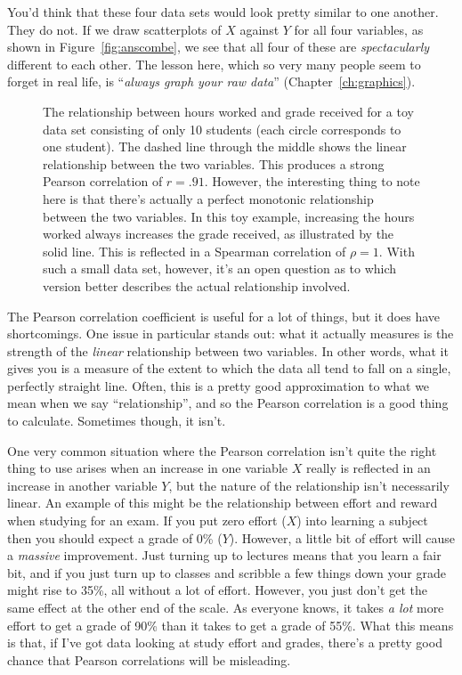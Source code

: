 You'd think that these four data sets would look pretty similar to one another. They do not. If we draw scatterplots of $X$ against $Y$ for all four variables, as shown in Figure~\ref{fig:anscombe}, we see that all four of these are {\it spectacularly} different to each other. The lesson here, which so very many people seem to forget in real life, is ``{\it always graph your raw data}'' (Chapter~\ref{ch:graphics}).


\begin{figure}[htb]
\begin{center}
\end{center}
\caption{The relationship between hours worked and grade received for a toy data set consisting of only 10 students (each circle corresponds to one student). The dashed line through the middle shows the linear relationship between the two variables. This produces a strong Pearson correlation of $r = .91$. However, the interesting thing to note here is that there's actually a perfect monotonic relationship between the two variables. In this toy example, increasing the hours worked always increases the grade received, as illustrated by the solid line. This is reflected in a Spearman correlation of $\rho = 1$. With such a small data set, however, it's an open question as to which version better describes the actual relationship involved. }
\HR
\label{fig:rankcorrpic}
\end{figure}

The Pearson correlation coefficient is useful for a lot of things, but it does have shortcomings. One issue in particular stands out: what it actually measures is the strength of the {\it linear} relationship between two variables. In other words, what it gives you is a measure of the extent to which the data all tend to fall on a single, perfectly straight line. Often, this is a pretty good approximation to what we mean when we say ``relationship'', and so the Pearson correlation is a good thing to calculate. Sometimes though, it isn't. 

One very common situation where the Pearson correlation isn't quite the right thing to use arises when an increase in one variable $X$ really is reflected in an increase in another variable $Y$, but the nature of the relationship isn't necessarily linear. An example of this might be the relationship between effort and reward when studying for an exam. If you put zero effort ($X$) into learning a subject then you should expect a grade of 0\% ($Y$). However, a little bit of effort will cause a {\it massive} improvement. Just turning up to lectures means that you learn a fair bit, and if you just turn up to classes and scribble a few things down your grade might rise to 35\%, all without a lot of effort. However, you just don't get the same effect at the other end of the scale. As everyone knows, it takes {\it a lot} more effort to get a grade of 90\% than it takes to get a grade of 55\%. What this means is that, if I've got data looking at study effort and grades, there's a pretty good chance that Pearson correlations will be misleading. 


